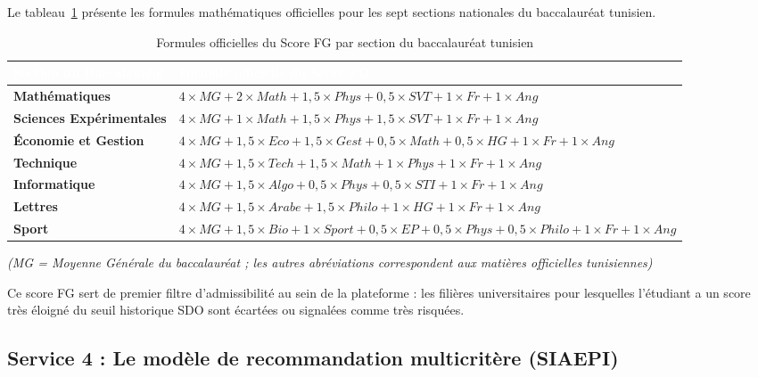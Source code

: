 Le tableau~\ref{tab:scorefg} présente les formules mathématiques officielles pour les sept sections nationales du baccalauréat tunisien.

\begin{table}[H]
\centering
\small
\begin{tabular}{|l|p{10.2cm}|}
\hline
\rowcolor{headercolor} 
\textcolor{white}{\textbf{Section du Baccalauréat}} & \textcolor{white}{\textbf{Formule officielle du Score FG}} \\
\hline
\textbf{Mathématiques} & $4 \times MG + 2 \times Math + 1{,}5 \times Phys + 0{,}5 \times SVT + 1 \times Fr + 1 \times Ang$ \\
\hline
\rowcolor{rowgray}
\textbf{Sciences Expérimentales} & $4 \times MG + 1 \times Math + 1{,}5 \times Phys + 1{,}5 \times SVT + 1 \times Fr + 1 \times Ang$ \\
\hline
\textbf{Économie et Gestion} & $4 \times MG + 1{,}5 \times Eco + 1{,}5 \times Gest + 0{,}5 \times Math + 0{,}5 \times HG + 1 \times Fr + 1 \times Ang$ \\
\hline
\rowcolor{rowgray}
\textbf{Technique} & $4 \times MG + 1{,}5 \times Tech + 1{,}5 \times Math + 1 \times Phys + 1 \times Fr + 1 \times Ang$ \\
\hline
\textbf{Informatique} & $4 \times MG + 1{,}5 \times Algo + 0{,}5 \times Phys + 0{,}5 \times STI + 1 \times Fr + 1 \times Ang$ \\
\hline
\rowcolor{rowgray}
\textbf{Lettres} & $4 \times MG + 1{,}5 \times Arabe + 1{,}5 \times Philo + 1 \times HG + 1 \times Fr + 1 \times Ang$ \\
\hline
\textbf{Sport} & $4 \times MG + 1{,}5 \times Bio + 1 \times Sport + 0{,}5 \times EP + 0{,}5 \times Phys + 0{,}5 \times Philo + 1 \times Fr + 1 \times Ang$ \\
\hline
\end{tabular}
\caption{Formules officielles du Score FG par section du baccalauréat tunisien}
\label{tab:scorefg}
\end{table}

\noindent \textit{(MG = Moyenne Générale du baccalauréat ; les autres abréviations correspondent aux matières officielles tunisiennes)}

Ce score FG sert de premier filtre d'admissibilité au sein de la plateforme : les filières universitaires pour lesquelles l'étudiant a un score très éloigné du seuil historique SDO sont écartées ou signalées comme très risquées.

\subsection{Service 4 : Le modèle de recommandation multicritère (SIAEPI)}

